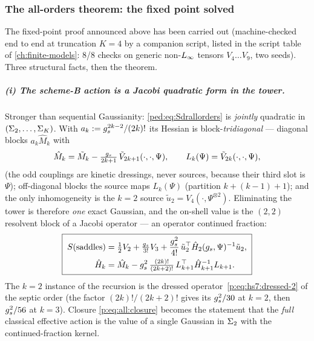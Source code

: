 \subsubsection{The all-orders theorem: the fixed point solved}
\label{ped:sec:allorders:theorem}

The fixed-point proof announced above has been carried out (machine-checked end to end
at truncation $K=4$ by a companion script, listed in the script table of
\cref{ch:finite-models}: 8/8 checks on generic
non-$L_\infty$ tensors $V_4\dots V_9$, two seeds). Three structural facts, then the
theorem.

\subparagraph{(i) The scheme-B action is a Jacobi quadratic form in the tower.} Stronger
than sequential Gaussianity: \eqref{ped:eq:Sdrallorders} is \emph{jointly} quadratic in
$(\Sigma_2,\dots,\Sigma_K)$. With $a_k:=g_s^{2k-2}/(2k)!$ its Hessian is
block-\emph{tridiagonal} --- diagonal blocks $a_k\hat M_k$ with
\begin{equation*}
	\hat M_k=\tilde M_k-\tfrac{g_s}{2k+1}\,\tilde V_{2k+1}(\cdot,\cdot,\Psi),\qquad
	L_k(\Psi)=\tilde V_{2k}(\cdot,\cdot,\Psi),
\end{equation*}
(the odd couplings are kinetic dressings, never sources, because their third slot is
$\Psi$); off-diagonal blocks the source maps $L_k(\Psi)$ (partition
$k+(k{-}1)+1$); and the only inhomogeneity is the $k=2$ source
$\tilde u_2=V_4(\cdot,\Psi^{\otimes2})$. Eliminating the tower is therefore \emph{one}
exact Gaussian, and the on-shell value is the $(2,2)$ resolvent block of a Jacobi
operator --- an operator continued fraction:
\begin{equation}
	\boxed{\;
	\begin{aligned}
	S(\text{saddles})
	&= \tfrac12V_2+\tfrac{g_s}{3!}V_3
	+ \frac{g_s^2}{4!}\,\tilde u_2^{\top}\hat H_2(g_s,\Psi)^{-1}\tilde u_2,\\
	\hat H_k &= \hat M_k - g_s^2\,\tfrac{(2k)!}{(2k+2)!}\,
	L_{k+1}^{\top}\hat H_{k+1}^{-1}L_{k+1}.
	\end{aligned}
	\;}
	\label{ped:eq:contfrac}
\end{equation}
The $k=2$ instance of the recursion is the dressed operator~\eqref{p:eq:hs7:dressed-2} of
the septic order (the factor $(2k)!/(2k+2)!$ gives its $g_s^2/30$ at $k=2$, then
$g_s^2/56$ at $k=3$). Closure
\eqref{p:eq:all:closure} becomes the statement that the \emph{full} classical effective
action is the value of a single Gaussian in $\Sigma_2$ with the continued-fraction
kernel.

